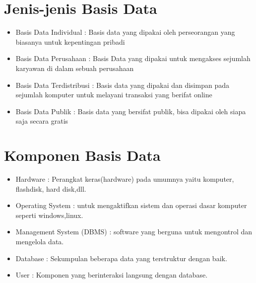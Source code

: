 \documentclass{article}
\begin{document}
\section{Jenis-jenis Basis Data}
\begin{itemize}
    \item Basis Data Individual : Basis data yang dipakai oleh perseorangan yang biasanya untuk kepentingan pribadi
    \item Basis Data Perusahaan : Basis Data yang dipakai untuk mengakses sejumlah karyawan di dalam sebuah perusahaan
    \item Basis Data Terdistribusi : Basis data yang dipakai dan disimpan pada sejumlah komputer untuk melayani transaksi yang berifat online
    \item Basis Data Publik : Basis data yang bersifat publik, bisa dipakai oleh siapa saja secara gratis
\end{itemize}{}

\newpage
\section{Komponen Basis Data}
\begin{itemize}
    \item Hardware : Perangkat keras(hardware) pada umumnya yaitu komputer, flashdisk, hard disk,dll.
    \item Operating System : untuk mengaktifkan sistem dan operasi dasar komputer seperti windows,linux.
    \item Management System (DBMS) : software yang berguna untuk mengontrol dan mengelola data.
    \item Database : Sekumpulan beberapa data yang terstruktur dengan baik.
    \item User : Komponen yang berinteraksi langsung dengan database.
\end{itemize}{}
\end{document}
